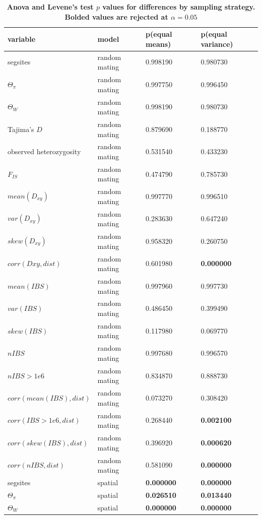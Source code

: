 \documentclass[10pt,twoside,lineno,hidelinks]{preprint} %
\begin{document}
\begin{table}[htbp]
\tiny
\centering
\caption{\bf Anova and Levene's test $p$ values for differences by sampling strategy. Bolded values are rejected at $\alpha=0.05$}
\begin{tableminipage}{\textwidth}
\begin{tabularx}{\textwidth}{XXXX}
  \hline
 variable & model & p(equal means) & p(equal variance) \\ 
  \hline
segsites & random mating & 0.998190 & 0.980730 \\ 
$\Theta_{\pi}$ & random mating & 0.997750 & 0.996450 \\ 
$\Theta_{W}$ & random mating & 0.998190 & 0.980730 \\ 
Tajima's $D$ & random mating & 0.879690 & 0.188770 \\ 
observed heterozygosity & random mating & 0.531540 & 0.433230 \\ 
$F_{IS}$ & random mating & 0.474790 & 0.785730 \\ 
$mean(D_{xy})$ & random mating & 0.997770 & 0.996510 \\ 
$var(D_{xy})$ & random mating & 0.283630 & 0.647240 \\ 
$skew(D_{xy})$ & random mating & 0.958320 & 0.260750 \\ 
$corr(Dxy,dist)$ & random mating & 0.601980 &\textbf{0.000000} \\ 
$mean(IBS)$ & random mating & 0.997960 & 0.997730 \\ 
$var(IBS)$ & random mating & 0.486450 & 0.399490 \\ 
$skew(IBS)$ & random mating & 0.117980 & 0.069770 \\ 
$nIBS$ & random mating & 0.997680 & 0.996570 \\ 
$nIBS>1e6$ & random mating & 0.834870 & 0.888730 \\ 
$corr(mean(IBS),dist)$ & random mating & 0.073270 & 0.308420 \\ 
$corr(IBS>1e6,dist)$ & random mating & 0.268440 & \textbf{0.002100} \\ 
$corr(skew(IBS),dist)$ & random mating & 0.396920 & \textbf{0.000620} \\ 
$corr(nIBS,dist)$ & random mating & 0.581090 & \textbf{0.000000} \\ 
segsites & spatial & \textbf{0.000000} & \textbf{0.000000} \\ 
$\Theta_{\pi}$ & spatial & \textbf{0.026510} & \textbf{0.013440} \\ 
$\Theta_{W}$ & spatial & \textbf{0.000000} & \textbf{0.000000} \\ 

\end{tabularx}
\end{tableminipage}
\end{table}
\end{document}
